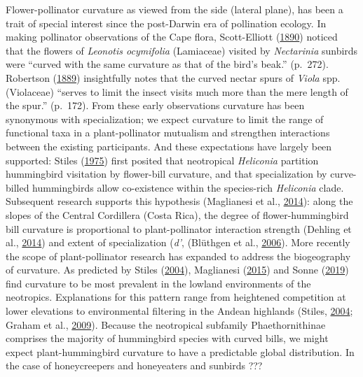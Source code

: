 \documentclass[]{article}
\begin{document}
Flower-pollinator curvature as viewed from the side (lateral plane), has
been a trait of special interest since the post-Darwin era of
pollination ecology. In making pollinator observations of the Cape
flora, Scott-Elliott (\protect\hyperlink{ref-scott-elliot_1890}{1890})
noticed that the flowers of \emph{Leonotis ocymifolia} (Lamiaceae)
visited by \emph{Nectarinia} sunbirds were ``curved with the same
curvature as that of the bird's beak.'' (p.~272). Robertson
(\protect\hyperlink{ref-robertson_1889}{1889}) insightfully notes that
the curved nectar spurs of \emph{Viola} spp. (Violaceae) ``serves to
limit the insect visits much more than the mere length of the spur.''
(p.~172). From these early observations curvature has been synonymous
with specialization; we expect curvature to limit the range of
functional taxa in a plant-pollinator mutualism and strengthen
interactions between the existing participants. And these expectations
have largely been supported: Stiles
(\protect\hyperlink{ref-stiles_1975}{1975}) first posited that
neotropical \emph{Heliconia} partition hummingbird visitation by
flower-bill curvature, and that specialization by curve-billed
hummingbirds allow co-existence within the species-rich \emph{Heliconia}
clade. Subsequent research supports this hypothesis (Maglianesi et al.,
\protect\hyperlink{ref-maglianesi_2014}{2014}): along the slopes of the
Central Cordillera (Costa Rica), the degree of flower-hummingbird bill
curvature is proportional to plant-pollinator interaction strength
(Dehling et al., \protect\hyperlink{ref-dehling_2014}{2014}) and extent
of specialization (\emph{d'}, (Blüthgen et al.,
\protect\hyperlink{ref-bluthgen_2006}{2006}). More recently the scope of
plant-pollinator research has expanded to address the biogeography of
curvature. As predicted by Stiles
(\protect\hyperlink{ref-stiles_2004}{2004}), Maglianesi
(\protect\hyperlink{ref-maglianesi_2015_b}{2015}) and Sonne
(\protect\hyperlink{ref-sonne_2019}{2019}) find curvature to be most
prevalent in the lowland environments of the neotropics. Explanations
for this pattern range from heightened competition at lower elevations
to environmental filtering in the Andean highlands (Stiles,
\protect\hyperlink{ref-stiles_2004}{2004}; Graham et al.,
\protect\hyperlink{ref-graham_2009}{2009}). Because the neotropical
subfamily Phaethornithinae comprises the majority of hummingbird species
with curved bills, we might expect plant-hummingbird curvature to have a
predictable global distribution. In the case of honeycreepers and
honeyeaters and sunbirds ???
\end{document}
